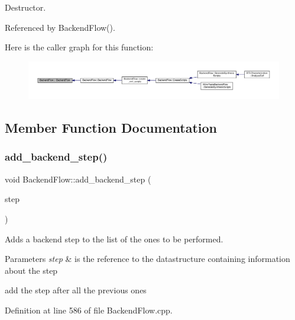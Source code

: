 Destructor. 



Referenced by Backend\+Flow().

Here is the caller graph for this function\+:
\nopagebreak
\begin{figure}[H]
\begin{center}
\leavevmode
\includegraphics[width=350pt]{da/d75/classBackendFlow_ae37237c3e94c8505422c9c668c97dce5_icgraph}
\end{center}
\end{figure}


\subsection{Member Function Documentation}
\mbox{\label{classBackendFlow_af68bbc810207b55865e16f5ef0b4a043}} 
\subsubsection{\texorpdfstring{add\+\_\+backend\+\_\+step()}{add\_backend\_step()}}
{\footnotesize\ttfamily void Backend\+Flow\+::add\+\_\+backend\+\_\+step (\begin{DoxyParamCaption}\item[{const \hyperlink{BackendFlow_8hpp_ab49214bb532f4d4cce15fd2e89eff5d7}{Backend\+Step\+Ref} \&}]{step }\end{DoxyParamCaption})}



Adds a backend step to the list of the ones to be performed. 


\begin{DoxyParams}{Parameters}
{\em step} & is the reference to the datastructure containing information about the step \\
\hline
\end{DoxyParams}
add the step after all the previous ones 

Definition at line 586 of file Backend\+Flow.\+cpp.



